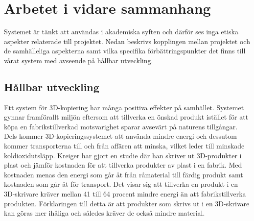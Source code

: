 



\section{Arbetet i vidare sammanhang}
\label{sec:work-wider-context}

Systemet är tänkt att användas i akademiska syften och därför ses inga etiska aspekter relaterade till projektet. Nedan beskrivs kopplingen mellan projektet och de samhälleliga aspekterna samt vilka specifika förbättringspunkter det finns till vårat system med avseende på hållbar utveckling.

\subsection{Hållbar utveckling}
\label{disc:hållbar_utveckling}
Ett system för 3D-kopiering har många positiva effekter på samhället. Systemet gynnar framförallt miljön eftersom att tillverka en önskad produkt istället för att köpa en fabrikstillverkad motsvarighet sparar avsevärt på naturens tillgångar. Dels kommer 3D-kopieringssystemet att använda mindre energi och dessutom kommer transporterna till och från affären att minska, vilket leder till minskade koldioxidutsläpp. Kreiger \cite{kreiger2013environmental} har gjort en studie där han skriver ut 3D-produkter i plast och jämför kostnaden för att tillverka produkter av plast i en fabrik. Med kostnaden menas den energi som går åt från råmaterial till färdig produkt samt kostnaden som går åt för transport. Det visar sig att tillverka en produkt i en 3D-skrivare kräver mellan 41 till 64 procent mindre energi än att fabrikstillverka produkten. Förklaringen till detta är att produkter som skrivs ut i en 3D-skrivare kan göras mer ihåliga och således kräver de också mindre material. 

